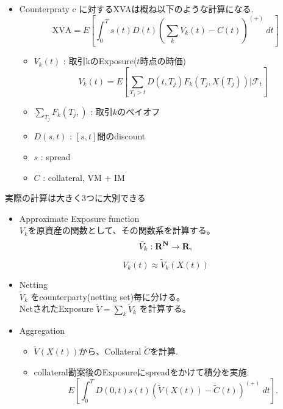 \documentclass[driverfallback=dvipdfmx,cjk]{beamer}
\begin{document}
\begin{frame}
    \begin{itemize}
        \item Counterpraty c に対するXVAは概ね以下のような計算になる.
            $$ \text{XVA}=  E\left[\int_0^T s(t)D(t)\left(\sum_{k}V_k(t)- C(t)\right)^{(+)} \ dt\right] $$
            \begin{itemize}
                \item $V_k(t)$ : 取引kのExposure($t$時点の時価)
                    $$ V_k(t) = E\left[ \sum_{T_j > t} D(t, T_j) F_k(T_j, X(T_j)) | \mathcal{F}_t\right]$$
                \item $\sum_{T_j } F_k(T_j, )$ : 取引$k$のペイオフ
                \item $D(s,t)$ : $[s, t]$間のdiscount
                \item $s$ : spread 
                \item $C$ : collateral, VM + IM
            \end{itemize}
    \end{itemize}
\end{frame} 

\begin{frame}
    実際の計算は大きく3つに大別できる
    \begin{itemize}
        \item Approximate Exposure function \\
            $V_k$を原資産の関数として、その関数系を計算する。
            $$ \tilde{V}_k: \bf{R}^N \rightarrow \bf{R},$$
            $$V_k(t) \approx \tilde{V}_k(X(t))$$
        \item Netting\\
            $\tilde{V}_k$ をcounterparty(netting set)毎に分ける。\\
            NetされたExposure $\tilde{V}=\sum_{k} \tilde{V}_k$
            を計算する。
        \item Aggregation
            \begin{itemize}
                \item $\tilde{V}(X(t))$から、Collateral $\tilde{C}$を計算.
                \item collateral勘案後のExposureにspreadをかけて積分を実施.
                    $$ E\left[\int_0^T D(0,t)s(t) \left(\tilde{V}(X(t)) -\tilde{C}(t) \right)^{(+)} \ dt\right].$$
            \end{itemize}
    \end{itemize}
\end{frame}
\end{document}
